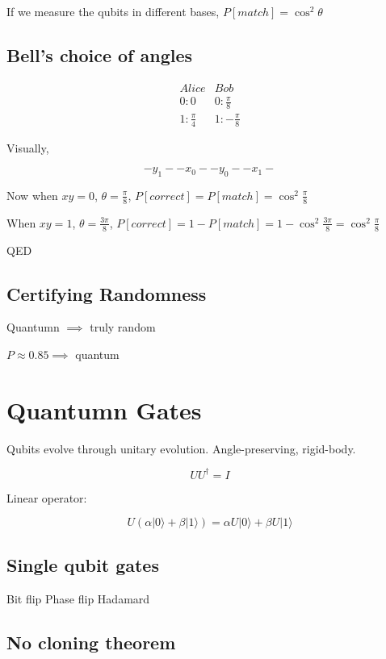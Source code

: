 \documentclass{article}
\newcommand{\<}{\langle}
\renewcommand{\>}{\rangle}
\newcommand{\q}[1] {|{#1 \rangle}}
\begin{document}
If we measure the qubits in different bases, $P[match] = \cos^2\theta$

\subsection{Bell's choice of angles}

$$
\begin{array}{cc}
Alice & Bob \\
0: 0 & 0: \frac{\pi}{8}\\
1: \frac{\pi}{4} & 1: -\frac{\pi}{8}
\end{array}
$$

Visually,

$$
-y_1--x_0--y_0--x_1-
$$

Now when $xy = 0$, $\theta = \frac{\pi}{8}$, $P[correct] = P[match] = \cos^2\frac{\pi}{8}$

When $xy = 1$, $\theta = \frac{3\pi}{8}$, $P[correct] = 1 - P[match] = 1 - \cos^2\frac{3\pi}{8} = \cos^2\frac{\pi}{8}$

QED

\subsection{Certifying Randomness}

Quantumn $\implies$ truly random

$P \approx 0.85 \implies$ quantum

\section{Quantumn Gates}

Qubits evolve through unitary evolution. Angle-preserving, rigid-body.

$$
U U^\dagger = I
$$

Linear operator:

$$
U(\alpha\q{0} + \beta\q{1}) = \alpha U\q{0} + \beta U\q{1}
$$

\subsection{Single qubit gates}

Bit flip
Phase flip
Hadamard

\subsection{No cloning theorem}
\end{document}
